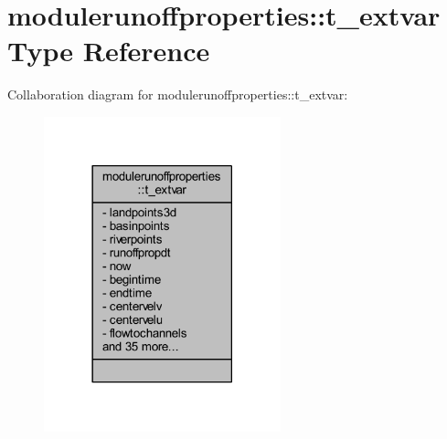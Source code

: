 \hypertarget{structmodulerunoffproperties_1_1t__extvar}{}\section{modulerunoffproperties\+:\+:t\+\_\+extvar Type Reference}
\label{structmodulerunoffproperties_1_1t__extvar}


Collaboration diagram for modulerunoffproperties\+:\+:t\+\_\+extvar\+:\nopagebreak
\begin{figure}[H]
\begin{center}
\leavevmode
\includegraphics[width=194pt]{structmodulerunoffproperties_1_1t__extvar__coll__graph}
\end{center}
\end{figure}

